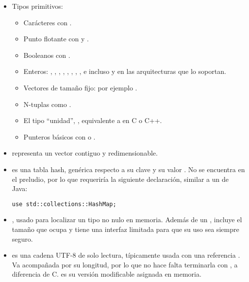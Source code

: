 \begin{itemize}
    \item Tipos primitivos:
        \begin{itemize}
            \item Carácteres con .

            \item Punto flotante con  y .

            \item Booleanos con .

            \item Enteros: , , , ,
                , , , , e incluso
                 y  en las arquitecturas que lo soportan.

            \item Vectores de tamaño fijo: por ejemplo \code{[1, 2, 3, 4, 5]}.

            \item N-tuplas como .

            \item El tipo ``unidad'', \code{()}, equivalente a  en C
                o C++.

            \item Punteros básicos con  o .

        \end{itemize}

    \item {} representa un vector contiguo y redimensionable.

    \item {} es una tabla hash, genérica respecto a su clave
         y su valor . No se encuentra en el preludio, por lo que
        requeriría la siguiente declaración, similar a un  de Java:

\begin{verbatim}
use std::collections::HashMap;
\end{verbatim}

    \item {}, usado para localizar un tipo  no nulo en
        memoria. Además de un , incluye el tamaño que ocupa
         y tiene una interfaz limitada para que su uso sea siempre
        seguro.

    \item {} es una cadena UTF-8 de solo lectura, típicamente usada con
        una referencia . Va acompañada por su longitud, por lo que no
        hace falta terminarla con \code{\0}, a diferencia de C.  es
        su versión modificable asignada en memoria.

\end{itemize}

